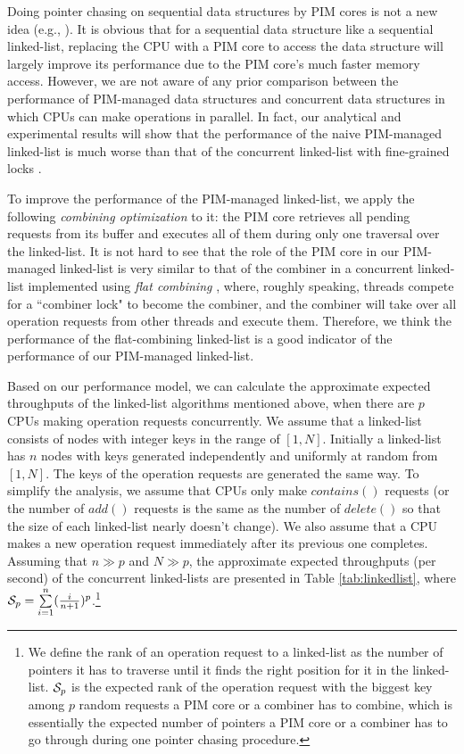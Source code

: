 Doing pointer chasing on sequential data structures by PIM cores is not a new idea
(e.g., \cite{hsieh2016accelerating, Ahn2015:2}).
It is obvious that for a sequential data structure like a sequential linked-list,
replacing the CPU with a PIM core to access the data structure will largely improve
its performance due to the PIM core's much faster memory access.
However, we are not aware of any prior comparison between the performance of
PIM-managed data structures and concurrent data structures
in which CPUs can make operations in parallel.
In fact, our analytical and experimental results will show that
the performance of the naive PIM-managed linked-list is much worse than
that of the concurrent linked-list with fine-grained locks \cite{Heller05}.

To improve the performance of the PIM-managed linked-list,
we apply the following \textit{combining optimization} to it:
the PIM core retrieves all pending requests from its buffer and
executes all of them during only one traversal over the linked-list.
It is not hard to see that the role of the PIM core in our PIM-managed linked-list
is very similar to that of the combiner in a concurrent linked-list implemented
using \textit{flat combining} \cite{Hendler10}, where, roughly speaking,
threads compete for a ``combiner lock" to become the combiner, and
the combiner will take over all operation requests from other threads and execute them.
Therefore, we think the performance of the flat-combining linked-list is a good indicator 
of the performance of our PIM-managed linked-list.

Based on our performance model, we can calculate the approximate expected
throughputs of the linked-list algorithms mentioned above, 
when there are $p$ CPUs making operation requests concurrently.
We assume that a linked-list consists of nodes with integer keys in the range of $[1, N]$.
Initially a linked-list has $n$ nodes with keys generated independently
and uniformly at random from $[1, N]$.
The keys of the operation requests are generated the same way.
To simplify the analysis, we assume that CPUs only make $contains()$ requests
(or the number of $add()$ requests is the same as the number of $delete()$
so that the size of each linked-list nearly doesn't change).
We also assume that a CPU makes a new operation request immediately after
its previous one completes.
Assuming that $n \gg p$ and $N \gg p$, the approximate expected throughputs (per second) 
of the concurrent linked-lists are presented in Table \ref{tab:linkedlist}, 
where $\mathcal{S}_{p} = \sum\limits_{i=1}^{n} ({i \over n+1})^{p}$.\footnote{
We define the rank of an operation request to a linked-list as the number of pointers
it has to traverse until it finds the right position for it in the linked-list.
$\mathcal{S}_{p}$ is the expected rank of the operation request with the biggest key
among $p$ random requests a PIM core or a combiner has to combine,
which is essentially the expected number of pointers a PIM core or a combiner
has to go through during one pointer chasing procedure.}

